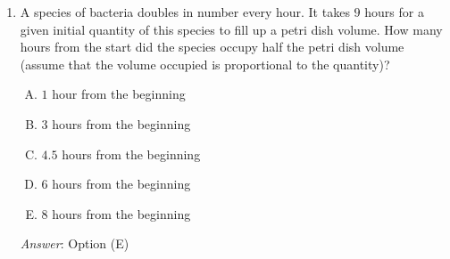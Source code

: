 \documentclass[10pt]{amsart}
\begin{document}
\begin{enumerate}
  {\em Answer}: Option (E)

  {\em Explanation}: If a population multiplies by a factor of $q$ in
  a time period $t$, the rate of growth is $(\ln q)/t$. We thus need
  to compare $(\ln 2)/2$, $(\ln 3)/3$, and $(\ln 4)/4$.

  First, note that since $\ln 4 = 2\ln 2$, $(\ln 2)/2 = (\ln
  4)/4$. Thus $A$ and $C$ grow at the same rate. This makes sense:
  doubling every $2$ hours is the same as quadrupling every $4$ hours.

  It remains to compare the value against $(\ln 3)/3$. We know that
  $\ln 3$ is between $1.09$ and $1.1$, so $(\ln 3)/3$ is between
  $0.363$ and $0.367$. $\ln 2$ is between $0.69$ and $0.7$, so $(\ln
  2)/2$ is between $0.345$ and $0.35$. Thus, $(\ln 3)/3$ is the bigger number.

  The comparison can be carried out without needing to know the $\ln$
  values. For this, consider the question: what happens after $6$
  hours? Species $A$ has doubled thrice, so it has multiplied by a
  factor of $2^3 = 8$. Species $B$ has tripled twice, so it has
  multiplied by a factor of $3^2 = 9$. Thus, after six hours, species
  $B$ is more numerous than species $A$. Hence, it must have a higher
  growth rate.

  {\em Performance review}: $7$ out of $12$ got this correct. $4$
  chose (D), $1$ chose (C).

  {\em Historical note (last year)}: $22$ out of $29$ people got this
  correct. $3$ people chose (D), $2$ people chose (B), and $1$ person
  each chose (A) and (C).
\item A species of bacteria doubles in number every hour. It takes $9$
  hours for a given initial quantity of this species to fill up a
  petri dish volume. How many hours from the start did the species
  occupy half the petri dish volume (assume that the volume occupied is
  proportional to the quantity)?

  \begin{enumerate}[(A)]
  \item $1$ hour from the beginning
  \item $3$ hours from the beginning
  \item $4.5$ hours from the beginning
  \item $6$ hours from the beginning
  \item $8$ hours from the beginning
  \end{enumerate}

  {\em Answer}: Option (E)


\end{enumerate}
\end{document}
